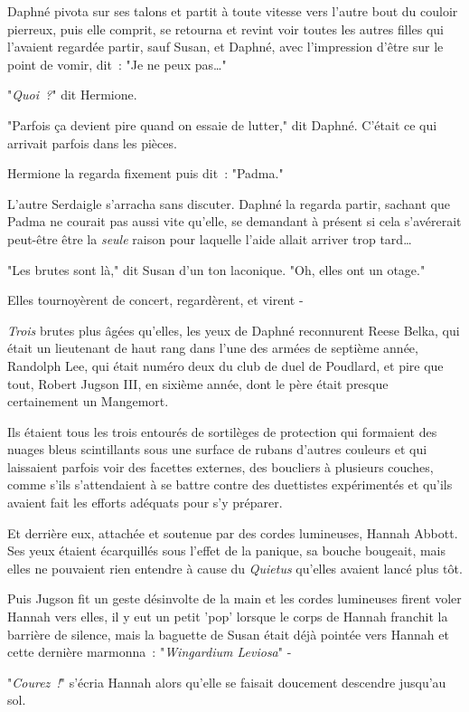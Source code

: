 Daphné pivota sur ses talons et partit à toute vitesse vers l'autre bout du couloir pierreux, puis elle comprit, se retourna et revint voir toutes les autres filles qui l'avaient regardée partir, sauf Susan, et Daphné, avec l'impression d'être sur le point de vomir, dit~: "Je ne peux pas…"

"\emph{Quoi~?}" dit Hermione.

"Parfois ça devient pire quand on essaie de lutter," dit Daphné. C'était ce qui arrivait parfois dans les pièces.

Hermione la regarda fixement puis dit~: "Padma."

L'autre Serdaigle s'arracha sans discuter. Daphné la regarda partir, sachant que Padma ne courait pas aussi vite qu'elle, se demandant à présent si cela s'avérerait peut-être être la \emph{seule} raison pour laquelle l'aide allait arriver trop tard…

"Les brutes sont là," dit Susan d'un ton laconique. "Oh, elles ont un otage."

Elles tournoyèrent de concert, regardèrent, et virent -

\emph{Trois} brutes plus âgées qu'elles, les yeux de Daphné reconnurent Reese Belka, qui était un lieutenant de haut rang dans l'une des armées de septième année, Randolph Lee, qui était numéro deux du club de duel de Poudlard, et pire que tout, Robert Jugson III, en sixième année, dont le père était presque certainement un Mangemort.

Ils étaient tous les trois entourés de sortilèges de protection qui formaient des nuages bleus scintillants sous une surface de rubans d'autres couleurs et qui laissaient parfois voir des facettes externes, des boucliers à plusieurs couches, comme s'ils s'attendaient à se battre contre des duettistes expérimentés et qu'ils avaient fait les efforts adéquats pour s'y préparer.

Et derrière eux, attachée et soutenue par des cordes lumineuses, Hannah Abbott. Ses yeux étaient écarquillés sous l'effet de la panique, sa bouche bougeait, mais elles ne pouvaient rien entendre à cause du \emph{Quietus} qu'elles avaient lancé plus tôt.

Puis Jugson fit un geste désinvolte de la main et les cordes lumineuses firent voler Hannah vers elles, il y eut un petit 'pop' lorsque le corps de Hannah franchit la barrière de silence, mais la baguette de Susan était déjà pointée vers Hannah et cette dernière marmonna~: "\emph{Wingardium Leviosa}" -

"\emph{Courez~!}" s'écria Hannah alors qu'elle se faisait doucement descendre jusqu'au sol.


